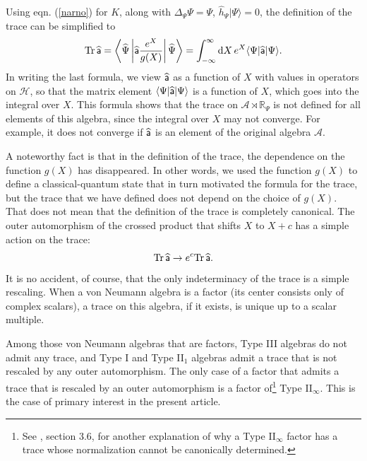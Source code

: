 \documentclass[11pt,a4paper]{article}
\def\a{{\sf a}}
\def\b{{\sf b}}
\def\be{\begin{equation}}
\def\ee{\end{equation}}
\def\h{\widehat}
\def\A{{\mathcal A}}
\def\d{{\mathrm d}}
\def\R{{\mathbb R}}
\def\h{\widehat}
\def\la{\langle}
\def\ra{\rangle}
\def\H{{\mathcal H}}
\def\Tr{\mathrm{Tr}}
\begin{document}
Using eqn. (\ref{narno}) for $K$, along with $\Delta_\Psi\Psi=\Psi$, $\h h_\Psi|\Psi\ra=0$, the definition of the trace can be simplified to
\be\label{hockey} \Tr\,\h\a =\left\la\h\Psi\left|\h\a \frac{e^X}{g(X)}\right|\h\Psi\right\ra=\int_{-\infty}^\infty\d X \,e^X \la\Psi|\h\a |\Psi\ra. \ee
In writing the last formula, we view $\h \a$ as a function of $X$ with values in operators on $\H$, so that the matrix element $ \la\Psi|\h\a |\Psi\ra$
is a function of $X$, which goes into the integral over $X$.  This formula shows
that the trace on $\A\rtimes \R_\Psi$ is not defined for all elements of this algebra, since the integral over $X$ may not converge.   For example,
it does not converge if $\h\a$ is an element of the original algebra $\A$.  


 A noteworthy fact is that in the definition of the trace, the dependence on the function $g(X)$ has disappeared.
In other words, we used the function $g(X)$ to define a classical-quantum state that in turn motivated the formula for the trace, but the trace
that we have defined does not depend on the choice of $g(X)$.  That does not mean that the definition of the trace is completely canonical.
The outer automorphism of the crossed product that shifts $X$ to $X+c$
has a simple action on the trace:
\be\label{hugge}\Tr\,\h \a\to e^c\Tr\,\h \a.\ee
It is no accident, of course, that the only indeterminacy of the trace is
 a simple rescaling.  When a von Neumann algebra is a factor (its center consists only of complex scalars),
a trace on this algebra, if it exists, is unique up to a scalar multiple.   

Among those von Neumann algebras that are factors, Type III algebras do not admit any trace, and Type I and Type II$_1$ algebras admit a trace that  is not rescaled by any outer automorphism.   The only case of a factor that admits a trace that is rescaled by an outer
automorphism is a factor of\footnote{See \cite{Lecture}, section 3.6, for another explanation of why a Type II$_\infty$ factor has a trace whose
normalization cannot be canonically determined.}  Type II$_\infty$.   This is the case of primary interest in the present article.
\end{document}
